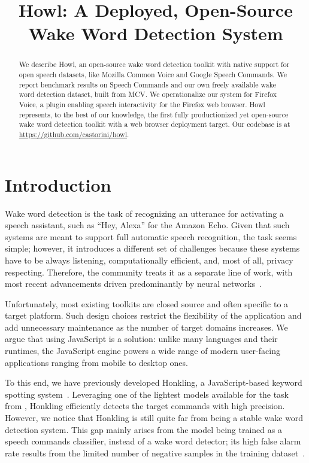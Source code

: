\documentclass[11pt,a4paper]{article}
\title{Howl: A Deployed, Open-Source Wake Word Detection System}
\author{Raphael Tang,\thanks{\hspace{2mm}Equal contribution. Order decided by coin flip.} \hspace{0.125cm}Jaejun Lee, Afsaneh Razi, Julia Cambre,\\ {\bf Ian Bicking, Jofish Kaye, \and Jimmy Lin}\\
David R. Cheriton School of Computer Science, University of Waterloo\\
Mozilla}
\date{}
\begin{document}
\maketitle
\begin{abstract}
We describe Howl, an open-source wake word detection toolkit with native support for open speech datasets, like Mozilla Common Voice and Google Speech Commands.
We report benchmark results on Speech Commands and our own freely available wake word detection dataset, built from MCV.
We operationalize our system for Firefox Voice, a plugin enabling speech interactivity for the Firefox web browser.
Howl represents, to the best of our knowledge, the first fully productionized yet open-source wake word detection toolkit with a web browser deployment target.
Our codebase is at \url{https://github.com/castorini/howl}.

\end{abstract}



\section{Introduction}
Wake word detection is the task of recognizing an utterance for activating a speech assistant, such as ``Hey, Alexa'' for the Amazon Echo.
Given that such systems are meant to support full automatic speech recognition, the task seems simple; however, it introduces a different set of challenges because these systems have to be always listening, computationally efficient, and, most of all, privacy respecting.
Therefore, the community treats it as a separate line of work, with most recent advancements driven predominantly by neural networks~\cite{sainath2015convolutional, tang2018deep}.


Unfortunately, most existing toolkits are closed source and often specific to a target platform.
Such design choices restrict the flexibility of the application and add unnecessary maintenance as the number of target domains increases.
We argue that using JavaScript is a solution: unlike many languages and their runtimes, the JavaScript engine powers a wide range of modern user-facing applications ranging from mobile  to desktop ones.


To this end, we have previously developed Honkling, a JavaScript-based keyword spotting system~\cite{lee2019honkling}.
Leveraging one of the lightest models available for the task from \citet{tang2018deep}, Honkling efficiently detects the target commands with high precision. 
However, we notice that Honkling is still quite far from being a stable wake word detection system.
This gap mainly arises from the model being trained as a speech commands classifier, instead of a wake word detector; its high false alarm rate results from the limited number of negative samples in the training dataset~\cite{warden2018speech}.
\end{document}
